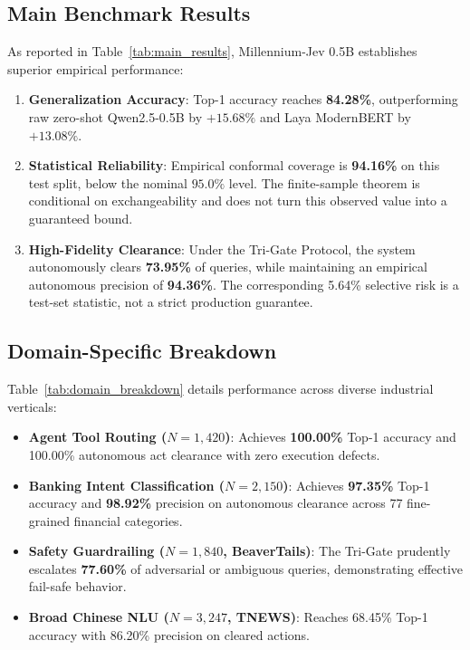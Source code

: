 \documentclass[11pt,a4paper]{article}
\begin{document}
\subsection{Main Benchmark Results}
As reported in Table~\ref{tab:main_results}, Millennium-Jev 0.5B establishes superior empirical performance:
\begin{enumerate}
    \item \textbf{Generalization Accuracy}: Top-1 accuracy reaches \textbf{84.28\%}, outperforming raw zero-shot Qwen2.5-0.5B by $+15.68\%$ and Laya ModernBERT by $+13.08\%$.
    \item \textbf{Statistical Reliability}: Empirical conformal coverage is \textbf{94.16\%} on this test split, below the nominal $95.0\%$ level. The finite-sample theorem is conditional on exchangeability and does not turn this observed value into a guaranteed bound.
    \item \textbf{High-Fidelity Clearance}: Under the Tri-Gate Protocol, the system autonomously clears \textbf{73.95\%} of queries, while maintaining an empirical autonomous precision of \textbf{94.36\%}. The corresponding 5.64\% selective risk is a test-set statistic, not a strict production guarantee.
\end{enumerate}

\subsection{Domain-Specific Breakdown}
Table~\ref{tab:domain_breakdown} details performance across diverse industrial verticals:
\begin{itemize}
    \item \textbf{Agent Tool Routing ($N=1,420$)}: Achieves \textbf{100.00\%} Top-1 accuracy and 100.00\% autonomous act clearance with zero execution defects.
    \item \textbf{Banking Intent Classification ($N=2,150$)}: Achieves \textbf{97.35\%} Top-1 accuracy and \textbf{98.92\%} precision on autonomous clearance across 77 fine-grained financial categories.
    \item \textbf{Safety Guardrailing ($N=1,840$, BeaverTails)}: The Tri-Gate prudently escalates \textbf{77.60\%} of adversarial or ambiguous queries, demonstrating effective fail-safe behavior.
    \item \textbf{Broad Chinese NLU ($N=3,247$, TNEWS)}: Reaches 68.45\% Top-1 accuracy with 86.20\% precision on cleared actions.
\end{itemize}
\end{document}
